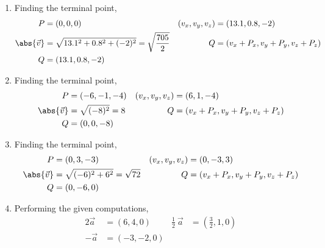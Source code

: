 \begin{enumerate}
    \item Finding the terminal point,
          \begin{align}
              P                       & = (0, 0, 0)                         &
              (v_x, v_y, v_z)         & = (13.1, 0.8, -2)                     \\
              \abs{ \vec{v} }   & = \sqrt{13.1^2 + 0.8^2 + (-2)^2}
              =  \sqrt{\frac{705}{2}} &
              Q                       & = (v_x + P_x, v_y + P_y, v_z + P_z)   \\
              Q                       & = (13.1, 0.8, -2)
          \end{align}

    \item Finding the terminal point,
          \begin{align}
              P                     & = (-6, -1, -4)                      &
              (v_x, v_y, v_z)       & = (6, 1, -4)                          \\
              \abs{ \vec{v} } & = \sqrt{(-8)^2}
              =  8                  &
              Q                     & = (v_x + P_x, v_y + P_y, v_z + P_z)   \\
              Q                     & = (0, 0, -8)
          \end{align}

    \item Finding the terminal point,
          \begin{align}
              P                     & = (0, 3, -3)                        &
              (v_x, v_y, v_z)       & = (0, -3, 3)                          \\
              \abs{ \vec{v} } & = \sqrt{(-6)^2 + 6^2}
              =  \sqrt{72}          &
              Q                     & = (v_x + P_x, v_y + P_y, v_z + P_z)   \\
              Q                     & = (0, -6, 0)
          \end{align}

    \item Performing the given computations,
          \begin{align}
              2\vec{a}             & = (6, 4, 0)                        &
              \frac{1}{2}\ \vec{a} & = \left( \frac{3}{2}, 1, 0 \right)   \\
              -\vec{a}             & = (-3, -2, 0)                      &
          \end{align}


\end{enumerate}
